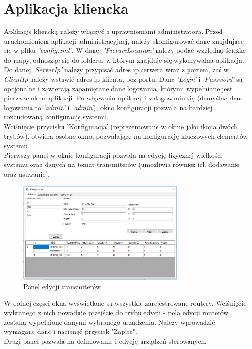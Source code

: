 	
	\section{Aplikacja kliencka}
	
	Aplikacje kliencką należy włączyć z uprawnieniami administratora. Przed uruchomieniem aplikacji administracyjnej, należy skonfigurować dane znajdujące się w pliku \textit{'config.xml'}. W danej \textit{'PictureLocation'} należy podać względną ścieżkę do mapy, odnosząc się do folderu, w którym znajduje się wykonywalna aplikacja. Do danej \textit{'ServerIp'} należy przypisać adres ip serwera wraz z portem, zaś w \textit{ClientIp} należy wstawić adres ip klienta, bez portu. Dane \textit{'Login'} i \textit{'Password'} są opcjonalne i zawierają zapamiętane dane logowania, którymi wypełniane jest pierwsze okno aplikacji. Po włączeniu aplikacji i zalogowaniu się (domyślne dane logowania to \textit{'admin'} i \textit{'admin'}), okno konfiguracji pozwala na bardziej rozbudowaną konfigurację systemu.\\
	Wciśnięcie przycisku 'Konfiguracja' (reprezentowane w oknie jako ikona dwóch trybów), otwiera osobne okno, pozwalające na konfigurację kluczowych elementów systemu.\\
	Pierwszy panel w oknie konfiguracji pozwala na edycję fizycznej wielkości systemu oraz danych na temat transmiterów (umożliwia również ich dodawanie oraz usuwanie).
	\begin{figure}[H]			
		\centering
		\caption{Panel edycji transmiterów}
		\includegraphics[width=0.75\textwidth]{panel_konf_router}
	\end{figure}
	W dolnej części okna wyświetlone są wszystkie zarejestrowane routery. Wciśnięcie wybranego z nich powoduje przejście do trybu edycji - pola edycji routerów zostaną wypełnione danymi wybranego urządzenia. Należy wprowadzić wymagane dane i nacisnąć przycisk "Zapisz".\\
	Drugi panel pozwala na definiowanie i edycję urządzeń sterowanych.
